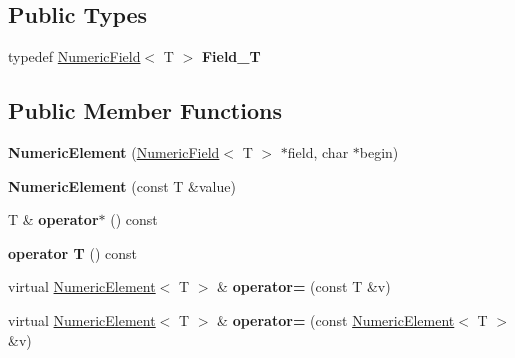 \subsection*{Public Types}
\begin{DoxyCompactItemize}
\item 
typedef \hyperlink{classNumericField}{Numeric\+Field}$<$ T $>$ {\bfseries Field\+\_\+T}\hypertarget{classNumericElement_a2eb88b95be95d26b1b85cdbaeeb204fa}{}\label{classNumericElement_a2eb88b95be95d26b1b85cdbaeeb204fa}

\end{DoxyCompactItemize}
\subsection*{Public Member Functions}
\begin{DoxyCompactItemize}
\item 
{\bfseries Numeric\+Element} (\hyperlink{classNumericField}{Numeric\+Field}$<$ T $>$ $\ast$field, char $\ast$begin)\hypertarget{classNumericElement_a1f791a554827c445bfdaac5c687f505e}{}\label{classNumericElement_a1f791a554827c445bfdaac5c687f505e}

\item 
{\bfseries Numeric\+Element} (const T \&value)\hypertarget{classNumericElement_a84cffceeff83dd2e6c7446c524c7427a}{}\label{classNumericElement_a84cffceeff83dd2e6c7446c524c7427a}

\item 
T \& {\bfseries operator$\ast$} () const \hypertarget{classNumericElement_a3a4de3b5027f2992c8e2984b52c8b46b}{}\label{classNumericElement_a3a4de3b5027f2992c8e2984b52c8b46b}

\item 
{\bfseries operator T} () const \hypertarget{classNumericElement_ad5cd11809018c872a68ecba21ee83248}{}\label{classNumericElement_ad5cd11809018c872a68ecba21ee83248}

\item 
virtual \hyperlink{classNumericElement}{Numeric\+Element}$<$ T $>$ \& {\bfseries operator=} (const T \&v)\hypertarget{classNumericElement_ad89e52aae78a5ab2f0c49a520db66bc9}{}\label{classNumericElement_ad89e52aae78a5ab2f0c49a520db66bc9}

\item 
virtual \hyperlink{classNumericElement}{Numeric\+Element}$<$ T $>$ \& {\bfseries operator=} (const \hyperlink{classNumericElement}{Numeric\+Element}$<$ T $>$ \&v)\hypertarget{classNumericElement_abb75aa68e7c4227a15d3eeeb62276fd2}{}\label{classNumericElement_abb75aa68e7c4227a15d3eeeb62276fd2}


\end{DoxyCompactItemize}
